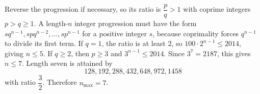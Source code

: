 Reverse the progression if necessary, so its ratio is $\dfrac{p}{q}>1$ with coprime integers $p>q\ge1$. A length-$n$ integer progression must have the form
$sq^{n-1},spq^{n-2},\ldots,sp^{n-1}$
for a positive integer $s$, because coprimality forces $q^{n-1}$ to divide its first term.
If $q=1$, the ratio is at least $2$, so $100\cdot2^{n-1}\le2014$, giving $n\le5$.
If $q\ge2$, then $p\ge3$ and $3^{n-1}\le2014$. Since $3^7=2187$, this gives $n\le7$.
Length seven is attained by
\[
128,192,288,432,648,972,1458
\]
with ratio $\dfrac{3}{2}$. Therefore $\boxed{n_{\max}=7}$.

